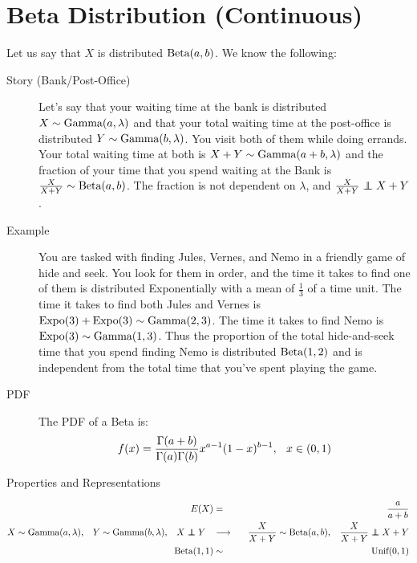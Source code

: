 \documentclass[11pt]{article}
\theoremstyle{definition}
\theoremstyle{remark}
\newcommand\independent{\protect\mathpalette{\protect\independenT}{\perp}}
\def\independenT#1#2{\mathrel{\rlap{$#1#2$}\mkern2mu{#1#2}}}
\newcommand{\Unif}{\textnormal{Unif}}
\newcommand{\Beta}{\textnormal{Beta}}
\newcommand{\Expo}{\textnormal{Expo}}
\newcommand{\Gam}{\textnormal{Gamma}}
\begin{document}
\section{Beta Distribution (Continuous)}
\begin{description}
\item Let us say that $X$ is distributed $\Beta(a, b)$. We know the following:
\begin{description}
	\item[Story (Bank/Post-Office)] Let's say that your waiting time at the bank is distributed $X \sim \Gam(a, \lambda)$ and that your total waiting time at the post-office is distributed $Y \sim \Gam(b, \lambda)$. You visit both of them while doing errands. Your total waiting time at both is $X + Y \sim \Gam(a + b, \lambda)$ and the fraction of your time that you spend waiting at the Bank is $\frac{X}{X+Y} \sim \Beta(a, b)$. The fraction is not dependent on $\lambda$, and $\frac{X}{X+Y} \independent X + Y$.
	\item[Example] You are tasked with finding Jules, Vernes, and Nemo in a friendly game of hide and seek. You look for them in order, and the time it takes to find one of them is distributed Exponentially with a mean of $\frac{1}{3}$ of a time unit. The time it takes to find both Jules and Vernes is $\Expo(3) + \Expo(3) \sim \Gam(2, 3)$. The time it takes to find Nemo is $\Expo(3) \sim \Gam(1, 3)$. Thus the proportion of the total hide-and-seek time that you spend finding Nemo is distributed $\Beta(1, 2)$ and is independent from the total time that you've spent playing the game.
	\item[PDF] The PDF of a Beta is:
		\begin{eqnarray*}
		f(x) = \frac{\Gamma(a+b)}{\Gamma(a)\Gamma(b)}x^{a-1}(1-x)^{b-1},
		\hspace{.1 in}
		x \in (0, 1)
		\end{eqnarray*}
	\item[Properties and Representations]
\end{description}
\end{description}
\vspace{-.4 cm}
	\begin{eqnarray*}
		E(X) &=& \frac{a}{a + b} \\
		X \sim \Gam(a, \lambda), \hspace{.3cm} Y \sim \Gam(b, \lambda), \hspace{.3cm} X\independent Y \hspace{.3cm} &\longrightarrow& \hspace{.3cm} \frac{X}{X + Y} \sim \Beta(a, b), \hspace{.3cm} \frac{X}{X + Y} \independent X + Y \\
		\Beta(1, 1) &\sim& \Unif(0, 1)
	\end{eqnarray*}
\end{document}
